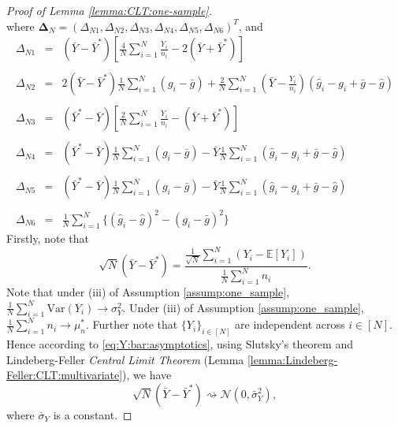 \documentclass[12pt,letterpaper]{article}
\begin{document}
\begin{proof}[Proof of Lemma \ref{lemma:CLT:one-sample}]
\begin{equation}
\end{equation}
where $\mathbf{\Delta}_{N}=(\Delta_{N1},\Delta_{N2},\Delta_{N3},\Delta_{N4},\Delta_{N5},\Delta_{N6})^T$, and 
\begin{equation}\label{eq:Delta:N:matrix}
\begin{array}{rcl}
\Delta_{N1}\!\!\!\!&=&\!\!\!\!\displaystyle(\bar{Y}-\bar{Y}^*)\left[\frac{4}{N}\sum_{i=1}^N\frac{Y_i}{n_i}-2(\bar{Y}+\bar{Y}^*)\right]\\
\\
\Delta_{N2}\!\!\!\!&=&\!\!\!\!\displaystyle2(\bar{Y}-\bar{Y}^*)\frac{1}{N}\sum_{i=1}^N(g_i-\bar{g})+\frac{2}{N}\sum_{i=1}^N\left(\bar{Y}-\frac{Y_i}{n_i}\right)(\hat{g}_i-g_i+\bar{g}-\hat{g})\\
\\
\Delta_{N3}\!\!\!\!&=&\!\!\!\!\displaystyle(\bar{Y}^*-\bar{Y})\left[\frac{2}{N}\sum_{i=1}^N\frac{Y_i}{n_i}-(\bar{Y}+\bar{Y}^*)\right]\\
\\
\Delta_{N4}\!\!\!\!&=&\!\!\!\!\displaystyle(\bar{Y}^*-\bar{Y})\frac{1}{N}\sum_{i=1}^N(g_i-\bar{g})-\bar{Y}\frac{1}{N}\sum_{i=1}^N(\hat{g}_i-g_i+\bar{g}-\hat{g})\\
\\
\Delta_{N5}\!\!\!\!&=&\!\!\!\!\displaystyle(\bar{Y}^*-\bar{Y})\frac{1}{N}\sum_{i=1}^N(g_i-\bar{g})-\bar{Y}\frac{1}{N}\sum_{i=1}^N(\hat{g}_i-g_i+\bar{g}-\hat{g})\\
\\
\Delta_{N6}\!\!\!\!&=&\!\!\!\!\displaystyle\frac{1}{N}\sum_{i=1}^N\{(\hat{g}_i-\hat{g})^2-(g_i-\bar{g})^2\}
\end{array}
\end{equation}
Firstly, note that 
\begin{equation}\label{eq:Y:bar:asymptotics}
\sqrt{N}\left(\bar{Y}-\bar{Y}^*\right)=\frac{\frac{1}{\sqrt{N}}\sum_{i=1}^N(Y_i-\mathbb{E}[Y_i])}{\frac{1}{N}\sum_{i=1}^Nn_i}.
\end{equation}
Note that under (iii) of Assumption \ref{assump:one_sample}, $\frac{1}{N}\sum_{i=1}^N\mathrm{Var}(Y_i)\rightarrow\sigma_Y^2$. Under (iii) of Assumption \ref{assump:one_sample}, $\frac{1}{N}\sum_{i=1}^Nn_i\rightarrow\mu_n^*$. Further note that $\{Y_i\}_{i\in[N]}$ are independent across $i\in[N]$. Hence according to \eqref{eq:Y:bar:asymptotics},  using Slutsky's theorem and Lindeberg-Feller \textit{Central Limit Theorem} (Lemma \ref{lemma:Lindeberg-Feller:CLT:multivariate}), we have 
\begin{equation}\label{eq:Y:bar:normality}
  \sqrt{N}(\bar{Y}-\bar{Y}^*)\rightsquigarrow\mathcal{N}(0,\bar{\sigma}_Y^2),  
\end{equation}
where $\bar{\sigma}_Y$ is a constant. 


\end{proof}
\end{document}
